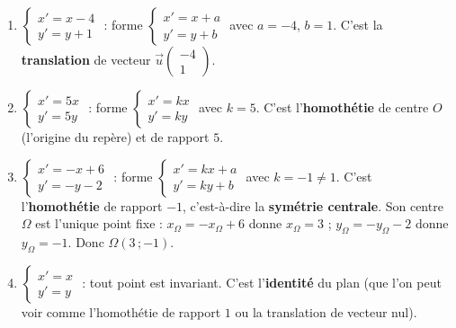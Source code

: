 \documentclass[11pt]{article}
\begin{document}
\begin{corrige}
\begin{enumerate}
\item $\begin{cases} x' = x - 4 \\ y' = y + 1 \end{cases}$ : forme $\begin{cases} x' = x + a \\ y' = y + b \end{cases}$ avec $a = -4$, $b = 1$. C'est la \textbf{translation} de vecteur $\vec{u}\begin{pmatrix} -4 \\ 1 \end{pmatrix}$.
\item $\begin{cases} x' = 5x \\ y' = 5y \end{cases}$ : forme $\begin{cases} x' = kx \\ y' = ky \end{cases}$ avec $k = 5$. C'est l'\textbf{homothétie} de centre $O$ (l'origine du repère) et de rapport $5$.
\item $\begin{cases} x' = -x + 6 \\ y' = -y - 2 \end{cases}$ : forme $\begin{cases} x' = kx + a \\ y' = ky + b \end{cases}$ avec $k = -1 \neq 1$. C'est l'\textbf{homothétie} de rapport $-1$, c'est-à-dire la \textbf{symétrie centrale}. Son centre $\Omega$ est l'unique point fixe : $x_\Omega = -x_\Omega + 6$ donne $x_\Omega = 3$ ; $y_\Omega = -y_\Omega - 2$ donne $y_\Omega = -1$. Donc $\Omega(3\,;-1)$.
\item $\begin{cases} x' = x \\ y' = y \end{cases}$ : tout point est invariant. C'est l'\textbf{identité} du plan (que l'on peut voir comme l'homothétie de rapport $1$ ou la translation de vecteur nul).
\end{enumerate}
\end{corrige}
\end{document}
